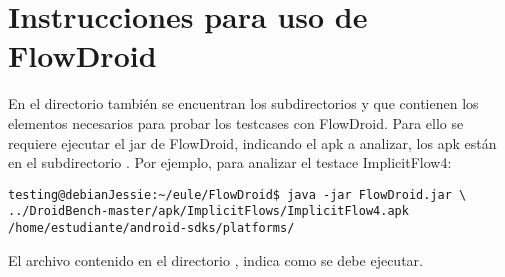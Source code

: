 \section{Instrucciones para uso de FlowDroid}
En el directorio \small{} también se encuentran
los subdirectorios \small{} y
\small{} que contienen los elementos necesarios
para probar los testcases con FlowDroid.\newline 
Para ello se requiere ejecutar el jar de FlowDroid, indicando el apk a analizar,
los apk están en el subdirectorio .
Por ejemplo, para analizar el testace ImplicitFlow4:
\begin{lstlisting}
testing@debianJessie:~/eule/FlowDroid$ java -jar FlowDroid.jar \
../DroidBench-master/apk/ImplicitFlows/ImplicitFlow4.apk
/home/estudiante/android-sdks/platforms/
\end{lstlisting}
El archivo \small{} contenido en el directorio
\small{\ttfamily{/FlowDroid}}, indica como se debe ejecutar.